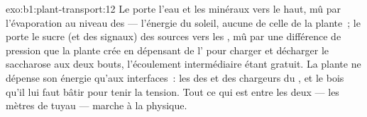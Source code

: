 \begin{solution}{exo:b1:plant-transport:12}
Le  porte l'eau et les minéraux vers le haut, mû par
l'évaporation au niveau des  --- l'énergie du soleil, aucune de
celle de la plante~; le  porte le sucre (et des signaux) des
sources vers les , mû par une différence de pression que la plante
crée en dépensant de l' pour charger et décharger le saccharose aux
deux bouts, l'écoulement intermédiaire étant gratuit. La plante ne
dépense son énergie qu'aux interfaces~: les  des
 et des chargeurs du , et le bois qu'il lui
faut bâtir pour tenir la tension. Tout ce qui est entre les deux ---
les mètres de tuyau --- marche à la physique.
\end{solution}

